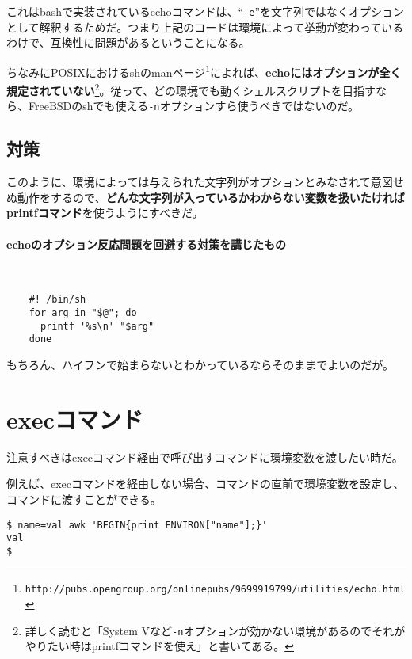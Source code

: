 これはbashで実装されているechoコマンドは、``\verb|-e|''を文字列ではなくオプションとして解釈するためだ。つまり上記のコードは環境によって挙動が変わっているわけで、互換性に問題があるということになる。

ちなみにPOSIXにおけるshのmanページ\footnote{\verb|http://pubs.opengroup.org/onlinepubs/9699919799/utilities/echo.html|}によれば、\textbf{echoにはオプションが全く規定されていない}\footnote{詳しく読むと「System Vなど\verb|-n|オプションが効かない環境があるのでそれがやりたい時はprintfコマンドを使え」と書いてある。}。従って、どの環境でも動くシェルスクリプトを目指すなら、FreeBSDのshでも使える\verb|-n|オプションすら使うべきではないのだ。

\subsection*{対策}

このように、環境によっては与えられた文字列がオプションとみなされて意図せぬ動作をするので、\textbf{どんな文字列が入っているかわからない変数を扱いたければprintfコマンド}を使うようにすべきだ。

\paragraph{echoのオプション反応問題を回避する対策を講じたもの} 　\\
\begin{frameboxit}{160.0mm}
\begin{verbatim}
	#! /bin/sh
	for arg in "$@"; do
	  printf '%s\n' "$arg"
	done
\end{verbatim}
\end{frameboxit}

もちろん、ハイフンで始まらないとわかっているならそのままでよいのだが。

\section{execコマンド}

注意すべきはexecコマンド経由で呼び出すコマンドに環境変数を渡したい時だ。

例えば、execコマンドを経由しない場合、コマンドの直前で環境変数を設定し、コマンドに渡すことができる。

\begin{screen}
	\verb|$ name=val awk 'BEGIN{print ENVIRON["name"];}'| \return \\
	\verb|val| \\
	\verb|$ |
\end{screen}

